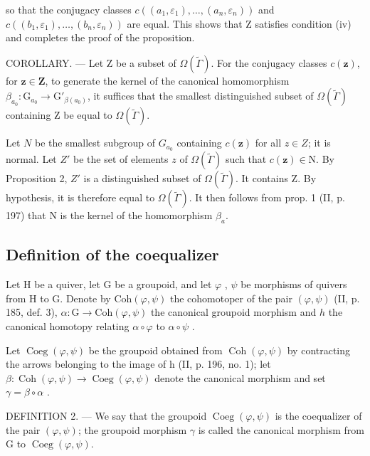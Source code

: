 so that the conjugacy classes \(c((a_{1},\varepsilon_{1}),\ldots,(a_{n},\varepsilon_{n}))\) and \(c((b_{1},\varepsilon_{1}),\ldots,(b_{n},\varepsilon_{n}))\) are equal. This shows that Z satisfies condition (iv) and completes the proof of the proposition.

COROLLARY. --- Let Z be a subset of \(\Omega(\widetilde{\Gamma})\). For the conjugacy classes \(c(\mathbf{z})\), for \(\mathbf{z} \in \mathbf{Z}\), to generate the kernel of the canonical homomorphism \(\beta_{a_0}: \mathrm{G}_{a_0} \to \mathrm{G}'_{\beta(a_0)}\), it suffices that the smallest distinguished subset of \(\Omega(\widetilde{\Gamma})\) containing Z be equal to \(\Omega(\widetilde{\Gamma})\).

Let \(N\) be the smallest subgroup of \(G_{a_{0}}\) containing \(c(\mathbf{z})\) for all \(z \in Z\); it is normal. Let \(Z'\) be the set of elements \(z\) of \(\Omega(\widetilde{\Gamma})\) such that \(c(\mathbf{z}) \in \mathrm{N}\). By Proposition 2, \(Z'\) is a distinguished subset of \(\Omega(\widetilde{\Gamma})\). It contains Z. By hypothesis, it is therefore equal to \(\Omega(\widetilde{\Gamma})\). It then follows from prop. 1 (II, p. 197) that N is the kernel of the homomorphism \(\beta_{a}\).

\subsection{Definition of the coequalizer}

Let H be a quiver, let G be a groupoid, and let \(\varphi\) , \(\psi\) be morphisms of quivers from H to G. Denote by \(\mathrm{Coh}(\varphi,\psi)\) the cohomotoper of the pair \((\varphi,\psi)\) (II, p. 185, def. 3), \(\alpha\colon\mathrm{G}\to\mathrm{Coh}(\varphi,\psi)\) the canonical groupoid morphism and \(h\) the canonical homotopy relating \(\alpha\circ\varphi\) to \(\alpha\circ\psi\) .

Let \(\operatorname{Coeg}(\varphi,\psi)\) be the groupoid obtained from \(\operatorname{Coh}(\varphi,\psi)\) by contracting the arrows belonging to the image of h (II, p. 196, no. 1); let \(\beta\colon\operatorname{Coh}(\varphi,\psi)\to\operatorname{Coeg}(\varphi,\psi)\) denote the canonical morphism and set \(\gamma=\beta\circ\alpha\) .

DEFINITION 2. --- We say that the groupoid \(\operatorname{Coeg}(\varphi,\psi)\) is the coequalizer of the pair \((\varphi,\psi)\); the groupoid morphism \(\gamma\) is called the canonical morphism from G to \(\operatorname{Coeg}(\varphi,\psi)\).

